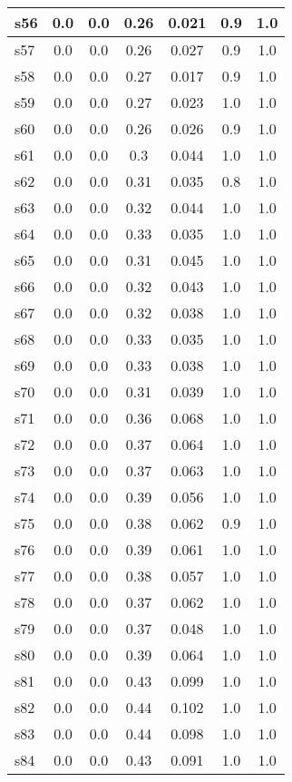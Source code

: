\documentclass{article}
\begin{document}
\begin{tabular}{|l|c|c|c|c|c|c|}
\hline
s56 &0.0 & 0.0 & 0.26 & 0.021 & 0.9 & 1.0\\
\hline
s57 &0.0 & 0.0 & 0.26 & 0.027 & 0.9 & 1.0\\
\hline
s58 &0.0 & 0.0 & 0.27 & 0.017 & 0.9 & 1.0\\
\hline
s59 &0.0 & 0.0 & 0.27 & 0.023 & 1.0 & 1.0\\
\hline
s60 &0.0 & 0.0 & 0.26 & 0.026 & 0.9 & 1.0\\
\hline
s61 &0.0 & 0.0 & 0.3 & 0.044 & 1.0 & 1.0\\
\hline
s62 &0.0 & 0.0 & 0.31 & 0.035 & 0.8 & 1.0\\
\hline
s63 &0.0 & 0.0 & 0.32 & 0.044 & 1.0 & 1.0\\
\hline
s64 &0.0 & 0.0 & 0.33 & 0.035 & 1.0 & 1.0\\
\hline
s65 &0.0 & 0.0 & 0.31 & 0.045 & 1.0 & 1.0\\
\hline
s66 &0.0 & 0.0 & 0.32 & 0.043 & 1.0 & 1.0\\
\hline
s67 &0.0 & 0.0 & 0.32 & 0.038 & 1.0 & 1.0\\
\hline
s68 &0.0 & 0.0 & 0.33 & 0.035 & 1.0 & 1.0\\
\hline
s69 &0.0 & 0.0 & 0.33 & 0.038 & 1.0 & 1.0\\
\hline
s70 &0.0 & 0.0 & 0.31 & 0.039 & 1.0 & 1.0\\
\hline
s71 &0.0 & 0.0 & 0.36 & 0.068 & 1.0 & 1.0\\
\hline
s72 &0.0 & 0.0 & 0.37 & 0.064 & 1.0 & 1.0\\
\hline
s73 &0.0 & 0.0 & 0.37 & 0.063 & 1.0 & 1.0\\
\hline
s74 &0.0 & 0.0 & 0.39 & 0.056 & 1.0 & 1.0\\
\hline
s75 &0.0 & 0.0 & 0.38 & 0.062 & 0.9 & 1.0\\
\hline
s76 &0.0 & 0.0 & 0.39 & 0.061 & 1.0 & 1.0\\
\hline
s77 &0.0 & 0.0 & 0.38 & 0.057 & 1.0 & 1.0\\
\hline
s78 &0.0 & 0.0 & 0.37 & 0.062 & 1.0 & 1.0\\
\hline
s79 &0.0 & 0.0 & 0.37 & 0.048 & 1.0 & 1.0\\
\hline
s80 &0.0 & 0.0 & 0.39 & 0.064 & 1.0 & 1.0\\
\hline
s81 &0.0 & 0.0 & 0.43 & 0.099 & 1.0 & 1.0\\
\hline
s82 &0.0 & 0.0 & 0.44 & 0.102 & 1.0 & 1.0\\
\hline
s83 &0.0 & 0.0 & 0.44 & 0.098 & 1.0 & 1.0\\
\hline
s84 &0.0 & 0.0 & 0.43 & 0.091 & 1.0 & 1.0\\

\end{tabular}
\end{document}
